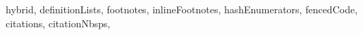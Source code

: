 \documentclass{article}
\begin{document}
\begin{markdown*}{%
  hybrid,
  definitionLists,
  footnotes,
  inlineFootnotes,
  hashEnumerators,
  fencedCode,
  citations,
  citationNbsps,
}
\end{markdown*}
\end{document}
